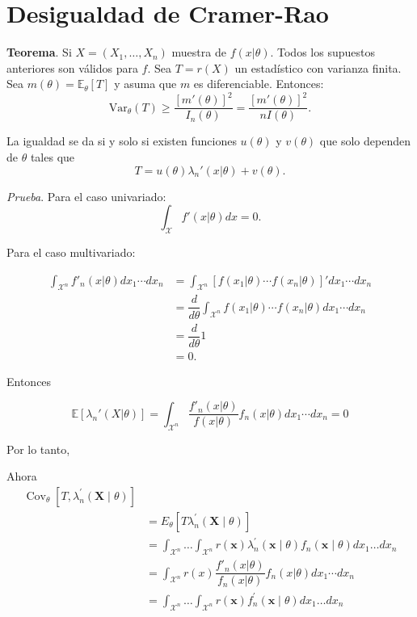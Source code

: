 \documentclass[
  12pt,
]{book}
\begin{document}
\hypertarget{desigualdad-de-cramer-rao}{%
\section{Desigualdad de Cramer-Rao}\label{desigualdad-de-cramer-rao}}

\textbf{Teorema}. Si \(X = (X_1,\dots, X_n)\) muestra de \(f(x|\theta)\). Todos los supuestos anteriores son válidos para \(f\). Sea \(T = r(X)\) un estadístico con varianza finita. Sea \(m(\theta) = \mathbb E_{\theta}[T]\) y asuma que \(m\) es diferenciable. Entonces:
\[\text{Var}_\theta(T)\geq \dfrac{[m'(\theta)]^2}{I_n(\theta)} =\dfrac{[m'(\theta)]^2}{nI(\theta)} .\]

La igualdad se da si y solo si existen funciones \(u(\theta)\) y \(v(\theta)\) que solo dependen de \(\theta\) tales que
\[T = u(\theta)\lambda_n'(x|\theta) + v(\theta).\]

\emph{Prueba}. Para el caso univariado:
\[\int_{\mathcal X}f'(x|\theta)dx = 0.\]

Para el caso multivariado:

\begin{align*}
\int_{\mathcal X^n}f'_n(x|\theta)dx_1\cdots dx_n & =\int_{\mathcal X^n}[f(x_1|\theta)\cdots f(x_n|\theta)]'dx_1\cdots dx_n \\
& = \dfrac d{d\theta} \int_{\mathcal X^n}f(x_1|\theta)\cdots f(x_n|\theta)dx_1\cdots dx_n \\
&= \dfrac d{d\theta} 1 \\
&= 0.
\end{align*}

Entonces

\[\mathbb E[\lambda_n'(X|\theta)] = \int_{\mathcal X^n}\dfrac{f'_n(x|\theta)}{f(x|\theta)} f_{n}(x\vert \theta)dx_1\cdots dx_n = 0\]

Por lo tanto,

Ahora
\begin{align*}
\operatorname{Cov}_{\theta}\left[T, \lambda_{n}^{\prime}(\boldsymbol{X} \mid
\theta)\right] \\
&=E_{\theta}\left[T \lambda_{n}^{\prime}(\boldsymbol{X} \mid \theta)\right] \\
&=\int_{\mathcal{X}^n} \ldots \int_{\mathcal{X}^n} r(\boldsymbol{x}) \lambda_{n}^{\prime}(\boldsymbol{x} \mid \theta) f_{n}(\boldsymbol{x} \mid \theta) d x_{1} \ldots d x_{n} \\
& =\int_{\mathcal X^n}r(x)\dfrac{f'_n(x|\theta)}{f_n(x|\theta)}f_n(x|\theta)dx_1\cdots dx_n\\
&=\int_{\mathcal{X}^n} \ldots \int_{\mathcal{X}^n} r(\boldsymbol{x}) f_{n}^{\prime}(\boldsymbol{x} \mid \theta) d x_{1} \ldots d x_{n}
\end{align*}
\end{document}
